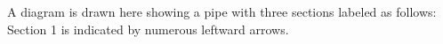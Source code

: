 A diagram is drawn here showing a pipe with three sections labeled as follows: Section 1 is indicated by numerous leftward arrows.